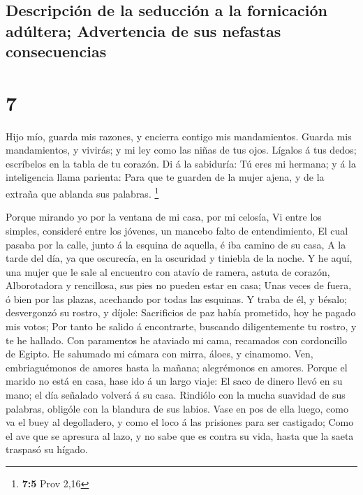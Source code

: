 \hypertarget{descripciuxf3n-de-la-seducciuxf3n-a-la-fornicaciuxf3n-aduxfaltera-advertencia-de-sus-nefastas-consecuencias}{%
\subsection{Descripción de la seducción a la fornicación adúltera;
Advertencia de sus nefastas
consecuencias}\label{descripciuxf3n-de-la-seducciuxf3n-a-la-fornicaciuxf3n-aduxfaltera-advertencia-de-sus-nefastas-consecuencias}}

\hypertarget{section-6}{%
\section{7}\label{section-6}}

 Hijo mío, guarda mis razones, y encierra contigo mis
mandamientos.  Guarda mis mandamientos, y vivirás; y mi ley
como las niñas de tus ojos.  Lígalos á tus dedos; escríbelos
en la tabla de tu corazón.  Di á la sabiduría: Tú eres mi
hermana; y á la inteligencia llama parienta:  Para que te
guarden de la mujer ajena, y de la extraña que ablanda sus palabras.
\footnote{\textbf{7:5} Prov 2,16}

 Porque mirando yo por la ventana de mi casa, por mi
celosía,  Vi entre los simples, consideré entre los jóvenes,
un mancebo falto de entendimiento,  El cual pasaba por la
calle, junto á la esquina de aquella, é iba camino de su casa,
 A la tarde del día, ya que oscurecía, en la oscuridad y
tiniebla de la noche.  Y he aquí, una mujer que le sale al
encuentro con atavío de ramera, astuta de corazón, 
Alborotadora y rencillosa, sus pies no pueden estar en casa;
 Unas veces de fuera, ó bien por las plazas, acechando por
todas las esquinas.  Y traba de él, y bésalo; desvergonzó
su rostro, y díjole:  Sacrificios de paz había prometido,
hoy he pagado mis votos;  Por tanto he salido á
encontrarte, buscando diligentemente tu rostro, y te he hallado.
 Con paramentos he ataviado mi cama, recamados con
cordoncillo de Egipto.  He sahumado mi cámara con mirra,
áloes, y cinamomo.  Ven, embriaguémonos de amores hasta la
mañana; alegrémonos en amores.  Porque el marido no está en
casa, hase ido á un largo viaje:  El saco de dinero llevó
en su mano; el día señalado volverá á su casa.  Rindiólo
con la mucha suavidad de sus palabras, obligóle con la blandura de sus
labios.  Vase en pos de ella luego, como va el buey al
degolladero, y como el loco á las prisiones para ser castigado;
 Como el ave que se apresura al lazo, y no sabe que es
contra su vida, hasta que la saeta traspasó su hígado.

